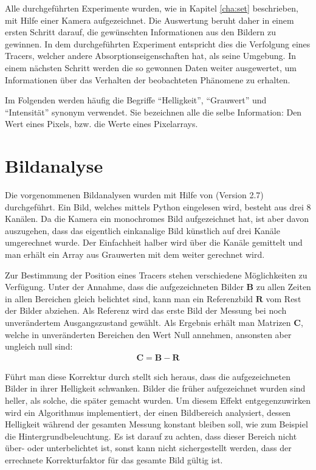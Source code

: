 \label{cha:meth}

Alle durchgeführten Experimente wurden, wie in Kapitel \ref{cha:set} beschrieben, mit Hilfe einer Kamera aufgezeichnet. Die Auswertung beruht daher in einem ersten Schritt darauf, die gewünschten Informationen aus den Bildern zu gewinnen. In dem durchgeführten Experiment entspricht dies die Verfolgung eines Tracers, welcher andere Absorptionseigenschaften hat, als seine Umgebung.
In einem nächsten Schritt werden die so gewonnen Daten weiter ausgewertet, um Informationen über das Verhalten der beobachteten Phänomene zu 
erhalten.

Im Folgenden werden häufig die Begriffe ``Helligkeit'', ``Grauwert'' und ``Intensität'' synonym verwendet. Sie bezeichnen alle die selbe Information: Den Wert eines Pixels, bzw. die Werte eines Pixelarrays.

\section{Bildanalyse}
\label{sec:ima}
Die vorgenommenen Bildanalysen wurden mit Hilfe von \cite{python} (Version 2.7) durchgeführt. 
Ein Bild, welches mittels Python eingelesen wird, besteht aus drei \SI{8}{\bit} Kanälen. Da die Kamera ein monochromes Bild aufgezeichnet hat, ist aber davon auszugehen, dass das eigentlich einkanalige Bild künstlich auf drei Kanäle umgerechnet wurde. Der Einfachheit halber wird über die Kanäle gemittelt und man erhält ein Array aus Grauwerten mit dem weiter gerechnet wird.

Zur Bestimmung der Position eines Tracers stehen verschiedene Möglichkeiten zu Verfügung.
Unter der Annahme, dass die aufgezeichneten Bilder $\mathbf{B}$ zu allen Zeiten in allen Bereichen gleich belichtet sind, kann man ein Referenzbild $\mathbf{R}$ vom Rest der Bilder abziehen. Als Referenz wird das erste Bild der Messung bei noch unverändertem Ausgangszustand gewählt. Als Ergebnis erhält man Matrizen $\mathbf{C}$, welche in unveränderten Bereichen den Wert Null annehmen, ansonsten aber ungleich null sind:
\begin{eqnarray}
 \mathbf{C} = \mathbf{B} - \mathbf{R}
\end{eqnarray}


Führt man diese Korrektur durch stellt sich heraus, dass die aufgezeichneten Bilder in ihrer Helligkeit schwanken. Bilder die früher aufgezeichnet wurden sind heller, als solche, die später gemacht wurden. Um diesem Effekt entgegenzuwirken wird ein Algorithmus implementiert, der einen Bildbereich analysiert, dessen Helligkeit während der gesamten Messung konstant bleiben soll, wie zum Beispiel die Hintergrundbeleuchtung. Es ist darauf zu achten, dass dieser Bereich nicht über- oder unterbelichtet ist, sonst kann nicht sichergestellt werden, dass der errechnete Korrekturfaktor für das gesamte Bild gültig ist. 

